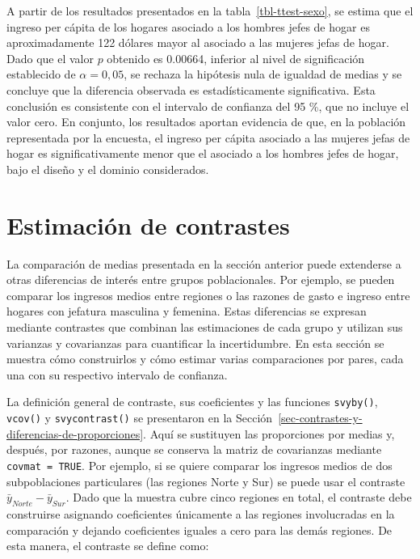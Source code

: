 \documentclass[
  spanish,
  11pt,
  letterpaper,
  oneside,
  open=any]{scrbook}
\begin{document}
A partir de los resultados presentados en la tabla~\ref{tbl-ttest-sexo},
se estima que el ingreso per cápita de los hogares asociado a los
hombres jefes de hogar es aproximadamente 122 dólares mayor al asociado
a las mujeres jefas de hogar. Dado que el valor \(p\) obtenido es
0.00664, inferior al nivel de significación establecido de
\(\alpha = 0,05\), se rechaza la hipótesis nula de igualdad de medias y
se concluye que la diferencia observada es estadísticamente
significativa. Esta conclusión es consistente con el intervalo de
confianza del 95 \%, que no incluye el valor cero. En conjunto, los
resultados aportan evidencia de que, en la población representada por la
encuesta, el ingreso per cápita asociado a las mujeres jefas de hogar es
significativamente menor que el asociado a los hombres jefes de hogar,
bajo el diseño y el dominio considerados.

\section{Estimación de contrastes}\label{estimacion-de-contrastes}

La comparación de medias presentada en la sección anterior puede
extenderse a otras diferencias de interés entre grupos poblacionales.
Por ejemplo, se pueden comparar los ingresos medios entre regiones o las
razones de gasto e ingreso entre hogares con jefatura masculina y
femenina. Estas diferencias se expresan mediante contrastes que combinan
las estimaciones de cada grupo y utilizan sus varianzas y covarianzas
para cuantificar la incertidumbre. En esta sección se muestra cómo
construirlos y cómo estimar varias comparaciones por pares, cada una con
su respectivo intervalo de confianza.

La definición general de contraste, sus coeficientes y las funciones
\texttt{svyby()}, \texttt{vcov()} y \texttt{svycontrast()} se
presentaron en la
Sección~\ref{sec-contrastes-y-diferencias-de-proporciones}. Aquí se
sustituyen las proporciones por medias y, después, por razones, aunque
se conserva la matriz de covarianzas mediante \texttt{covmat\ =\ TRUE}.
Por ejemplo, si se quiere comparar los ingresos medios de dos
subpoblaciones particulares (las regiones Norte y Sur) se puede usar el
contraste \(\bar{y}_{Norte} - \bar{y}_{Sur}\). Dado que la muestra cubre
cinco regiones en total, el contraste debe construirse asignando
coeficientes únicamente a las regiones involucradas en la comparación y
dejando coeficientes iguales a cero para las demás regiones. De esta
manera, el contraste se define como:
\end{document}

